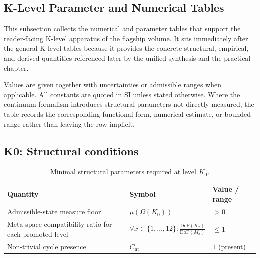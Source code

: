 
\subsection{K-Level Parameter and Numerical Tables}
\label{app:synthesis-constants-and-parameters}

This subsection collects the numerical and parameter tables that support the
reader-facing K-level apparatus of the flagship volume. It sits immediately
after the general K-level tables because it provides the concrete structural,
empirical, and derived quantities referenced later by the unified synthesis and the
practical chapter.

Values are given together with uncertainties or admissible ranges when
applicable. All constants are quoted in SI unless stated otherwise. Where the
continuum formalism introduces structural parameters not directly measured, the
table records the corresponding functional form, numerical estimate, or bounded
range rather than leaving the row implicit.

\begingroup
\footnotesize
\RaggedRight
\setlength{\tabcolsep}{4pt}



\subsection*{K0: Structural conditions}

\begin{table}[htbp]
  \centering
  \caption{Minimal structural parameters required at level \(K_0\).}
  \label{tab:k0-structural-parameters}
\begin{tabular}{@{}L{0.44\textwidth}L{0.16\textwidth}L{0.23\textwidth}@{}}
    \hline
    Quantity & Symbol & Value / range \\
    \hline
    Admissible-state measure floor & \(\mu(\Omega(K_0))\)
        & \(> 0\) \\
    Meta-space compatibility ratio for each promoted level & \(\forall x \in \{1,\dots,12\}: \frac{\mathrm{DoF}(K_x)}{\mathrm{DoF}(M_x)}\)
        & \(\leq 1\) \\
    Non-trivial cycle presence & \(C_{\mathrm{nt}}\)
        & \(1\) (present) \\
    \hline
\end{tabular}
\end{table}

